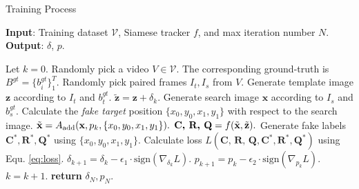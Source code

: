 \documentclass[journal]{IEEEtran}
\renewcommand{\uline}{}
\begin{document}
\begin{algorithm}[tb]
  \small
  \caption{Training Process}
  \label{alg:algorithm}
  \textbf{Input}: Training dataset $\mathcal{V}$, Siamese tracker $f$, and max iteration number $N$.\\
  \textbf{Output}: $\delta$, $p$.
  \begin{algorithmic}[1] %
  \STATE Let $k = 0$.
  \STATE Randomly pick a video $V\in \mathcal{V}$. The corresponding \uline{ground-truth} is $B^{gt}=\{b^{gt}_i\}^T_1$.
  \STATE Randomly pick paired frames $I_t, I_s$ from $V$.
  \STATE Generate template image $\textbf{z}$ according to $I_t$ and $b^{gt}_t$.
  \STATE $\tilde{\textbf{z}} = \textbf{z} + \delta_k.$
  \STATE Generate search image $\textbf{x}$ according to $I_s$ and $b^{gt}_s$.
  \STATE Calculate the \textit{fake target} position $\{x_0, y_0, x_1, y_1\}$ with respect to the search image.
  \STATE $\tilde{\textbf x} = A_{\text{add}}(\textbf x, p_k, \{x_0, y_0, x_1, y_1\}).$
  \STATE $\textbf{C, R, Q} = f(\tilde {\textbf x}, \tilde{\textbf z}).$
  \STATE Generate fake labels $\textbf{C}^*,\textbf{R}^*,\textbf{Q}^*$ using $\{x_0, y_0, x_1, y_1\}$.
  \STATE Calculate loss $L(\textbf{C, R, Q}, \textbf{C}^*, \textbf{R}^*, \textbf{Q}^*)$ using Equ. \ref{eq:loss}.
  \STATE $\delta_{k+1} = \delta_{k} - \epsilon_1 \cdot \text{sign}(\nabla_{\delta_k}L).$
  \STATE $p_{k+1} = p_{k} - \epsilon_2 \cdot \text{sign}(\nabla_{p_k}L).$
  \STATE $k = k + 1.$
  \ENDWHILE
  \STATE \textbf{return} $\delta_N, p_N.$
  \end{algorithmic}
  \label{alg}
\end{algorithm}
  
\end{document}

